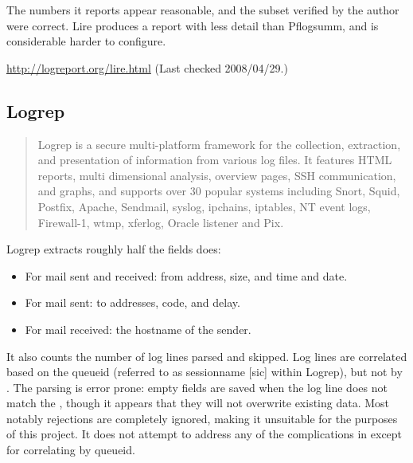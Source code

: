 The numbers it reports appear reasonable, and the subset verified by the
author were correct.  Lire produces a report with less detail than
Pflogsumm, and is considerable harder to configure.

\url{http://logreport.org/lire.html} \newline (Last checked 2008/04/29.)

\subsection{Logrep}

\begin{quotation}

    Logrep is a secure multi-platform framework for the collection,
    extraction, and presentation of information from various log files. It
    features HTML reports, multi dimensional analysis, overview pages, SSH
    communication, and graphs, and supports over 30 popular systems
    including Snort, Squid, Postfix, Apache, Sendmail, syslog, ipchains,
    iptables, NT event logs, Firewall-1, wtmp, xferlog, Oracle listener and
    Pix.

\end{quotation}

Logrep extracts roughly half the fields \parsername{} does:

\begin{itemize}

    \item For mail sent and received: from address, size, and time and
        date.

    \item For mail sent: to addresses, \SMTP{} code, and delay.

    \item For mail received: the hostname of the sender.

\end{itemize}

It also counts the number of log lines parsed and skipped.  Log lines are
correlated based on the queueid (referred to as sessionname [sic] within
Logrep), but not by \pid{}.  The parsing is error prone: empty fields are
saved when the log line does not match the \regex{}, though it appears that
they will not overwrite existing data.  Most notably rejections are
completely ignored, making it unsuitable for the purposes of this project.
It does not attempt to address any of the complications in
  except for
correlating by queueid.

